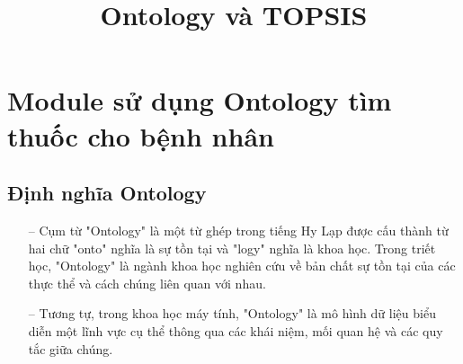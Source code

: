 \documentclass{article}
\title{Ontology và TOPSIS}
\begin{document}
\maketitle
\section{Module sử dụng Ontology tìm thuốc cho bệnh nhân}
\subsection{Định nghĩa Ontology}
\begin{itemize}
    \item[--] Cụm từ "Ontology" là một từ ghép trong tiếng Hy Lạp được cấu thành từ
hai chữ "onto" nghĩa là sự tồn tại và "logy" nghĩa là khoa học. Trong triết học, "Ontology"
là ngành khoa học nghiên cứu về bản chất sự tồn tại của các thực thể và cách chúng liên quan với nhau.
    \item[--] Tương tự, trong khoa học máy tính, "Ontology" là mô hình dữ liệu biểu diễn một lĩnh vực cụ thể
thông qua các khái niệm, mối quan hệ và các quy tắc giữa chúng.
\end{itemize}
\end{document}

